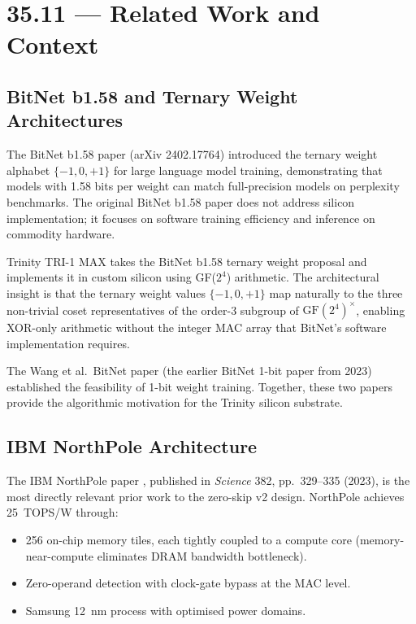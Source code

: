 \section{35.11 --- Related Work and Context}
\label{sec:glava35-related}

\subsection{BitNet b1.58 and Ternary Weight Architectures}

The BitNet b1.58 paper \cite{ma_bitnet_158} (arXiv 2402.17764) introduced
the ternary weight alphabet \(\{-1, 0, +1\}\) for large language model training,
demonstrating that models with 1.58 bits per weight can match full-precision
models on perplexity benchmarks.
The original BitNet b1.58 paper does not address silicon implementation;
it focuses on software training efficiency and inference on commodity hardware.

Trinity TRI-1 MAX takes the BitNet b1.58 ternary weight proposal and
implements it in custom silicon using GF(\(2^4\)) arithmetic.
The architectural insight is that the ternary weight values
\(\{-1, 0, +1\}\) map naturally to the three non-trivial coset representatives
of the order-3 subgroup of \(\mathrm{GF}(2^4)^\times\), enabling XOR-only
arithmetic without the integer MAC array that BitNet's software implementation
requires.

The Wang et al.\ BitNet paper \cite{wang_bitnet_2023} (the earlier BitNet 1-bit
paper from 2023) established the feasibility of 1-bit weight training.
Together, these two papers provide the algorithmic motivation for the
Trinity silicon substrate.

\subsection{IBM NorthPole Architecture}

The IBM NorthPole paper \cite{modha_northpole_2023}, published in
\emph{Science} 382, pp.\ 329--335 (2023), is the most directly relevant
prior work to the zero-skip v2 design.
NorthPole achieves 25~TOPS/W through:
\begin{itemize}
  \item 256 on-chip memory tiles, each tightly coupled to a compute core
        (memory-near-compute eliminates DRAM bandwidth bottleneck).
  \item Zero-operand detection with clock-gate bypass at the MAC level.
  \item Samsung 12~nm process with optimised power domains.
\end{itemize}

